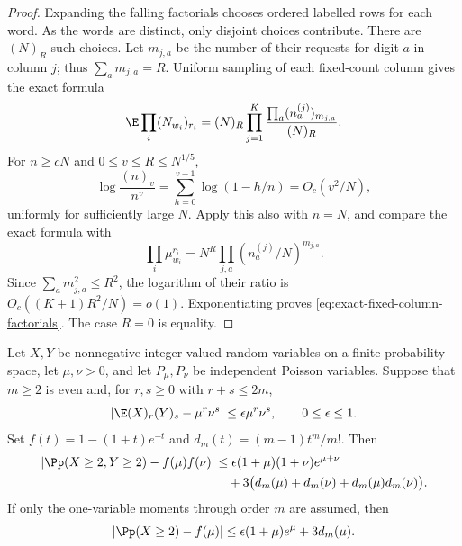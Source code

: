 \begin{proof}
Expanding the falling factorials chooses ordered labelled rows for each
word. As the words are distinct, only disjoint choices contribute. There
are $(N)_R$ such choices. Let $m_{j,a}$ be the number of their requests for
digit $a$ in column $j$; thus $\sum_a m_{j,a}=R$.
Uniform sampling of each fixed-count column gives the exact formula
\[
 \E\prod_i(N_{w_i})_{r_i}
 =(N)_R\prod_{j=1}^K
                \frac{\prod_a(n_a^{(j)})_{m_{j,a}}}{(N)_R}.
\]
For $n\ge cN$ and $0\le v\le R\le N^{1/5}$,
\[
 \log\frac{(n)_v}{n^v}
 =\sum_{h=0}^{v-1}\log(1-h/n)=O_c(v^2/N),
\]
uniformly for sufficiently large $N$. Apply this also with $n=N$,
and compare the exact formula with
\[
 \prod_i\mu_{w_i}^{r_i}
   =N^R\prod_{j,a}(n_a^{(j)}/N)^{m_{j,a}}.
\]
Since $\sum_a m_{j,a}^2\le R^2$, the logarithm of their ratio is
$O_c((K+1)R^2/N)=o(1)$. Exponentiating proves
\eqref{eq:exact-fixed-column-factorials}. The case $R=0$ is equality.
\end{proof}

\begin{lemma}
\label{lem:central-window}
Let $X,Y$ be nonnegative integer-valued random variables on a finite probability space, let $\mu,\nu>0$,
and let $P_\mu,P_\nu$ be independent Poisson variables. Suppose that $m\ge2$
is even and, for $r,s\ge0$ with $r+s\le2m$,
\[
 \left|\E(X)_r(Y)_s-\mu^r\nu^s\right|
 \le\epsilon\mu^r\nu^s,\qquad 0\le\epsilon\le1.
\]
Set $f(t)=1-(1+t)e^{-t}$ and $d_m(t)=(m-1)t^m/m!$. Then
\begin{align*}
 \left|\Pp(X\ge2,Y\ge2)-f(\mu)f(\nu)\right|
 &\le \epsilon(1+\mu)(1+\nu)e^{\mu+\nu}\\
 &\quad+3\bigl(d_m(\mu)+d_m(\nu)+d_m(\mu)d_m(\nu)\bigr).
\end{align*}
If only the one-variable moments through order $m$ are assumed, then
\[
 \left|\Pp(X\ge2)-f(\mu)\right|
 \le\epsilon(1+\mu)e^\mu+3d_m(\mu).
\]
\end{lemma}

